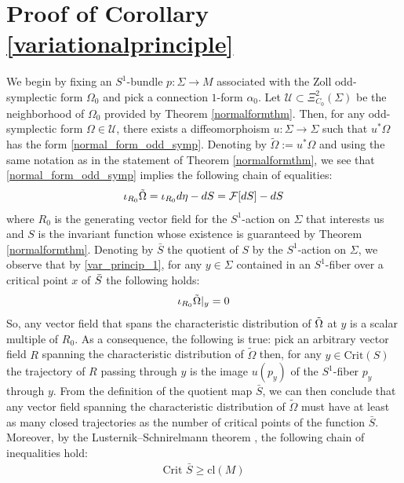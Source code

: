 \documentclass[11pt]{amsart}
\theoremstyle{plain}
\theoremstyle{definition}
\theoremstyle{remark}
\begin{document}
\section{Proof of Corollary \ref{variationalprinciple}}\label{proof_of_var_principle}
We begin by fixing an $S^1$-bundle $p:\Sigma \rightarrow M$ associated with the Zoll odd-symplectic form $\Omega_0$ and pick a connection $1$-form $\alpha_0$. Let $\mathcal{U} \subset \Xi^2_{C_0}(\Sigma)$ be the neighborhood of $\Omega_0$ provided by Theorem \ref{normalformthm}. Then, for any odd-symplectic form $\Omega \in \mathcal{U}$, there exists a diffeomorphoism $u:\Sigma \rightarrow \Sigma$ such that $u^*\Omega$ has the form \eqref{normal_form_odd_symp}. Denoting by $\tilde{\Omega}:= u^*\Omega$ and using the same notation as in the statement of Theorem \ref{normalformthm}, we see that \eqref{normal_form_odd_symp} implies the following chain of equalities:
\begin{align}\label{var_princip_1}
    \iota_{R_0} \Tilde{\Omega} = \iota_{R_0} d\eta - dS = \mathcal{F}[dS] - dS
\end{align}
where $R_0$ is the generating vector field for the $S^1$-action on $\Sigma$ that interests us and $S$ is the invariant function whose existence is guaranteed by Theorem \ref{normalformthm}. Denoting by $\bar{S}$ the quotient of $S$ by the $S^1$-action on $\Sigma$, we observe that by \eqref{var_princip_1}, for any $y \in \Sigma$ contained in an $S^1$-fiber over a critical point $x$ of $\Bar{S}$ the following holds:
\begin{align}
    \iota_{R_0} \Tilde{\Omega}|_{y} =0
\end{align}
So, any vector field that spans the characteristic distribution of $\Tilde{\Omega}$ at $y$ is a scalar multiple of $R_0$. As a consequence, the following is true: pick an arbitrary vector field $R$ spanning the characteristic distribution of $\tilde \Omega$ then, for any $y \in \text{Crit}(S)$ the trajectory of $R$ passing through $y$ is the image $u(p_y)$ of the $S^1$-fiber $p_y$ through $y$. From the definition of the quotient map $\bar S$, we can then conclude that any vector field spanning the characteristic distribution of $\tilde \Omega$ must have at least as many closed trajectories as the number of critical points of the function $\bar S$. Moreover, by the Lusternik–Schnirelmann theorem \cite[Theorem 11.2.9]{mcduffsalamon2017introduction}, the following chain of inequalities hold:
\begin{align}
    \text{Crit $\bar{S}$} \geq \text{cl}(M)
\end{align}
\end{document}
